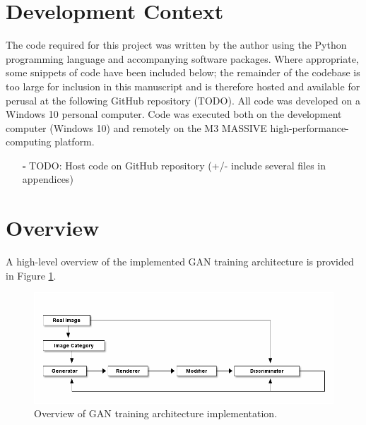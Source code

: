 \documentclass[a4paper,11pt,openany]{book}
\begin{document}
\section*{Development Context}
\label{sec:orga3f9e92}

The code required for this project was written by the author using the Python programming language and accompanying software packages.
Where appropriate, some snippets of code have been included below; the remainder of the codebase is too large for inclusion in this manuscript and is therefore hosted and available for perusal at the following GitHub repository (TODO).
All code was developed on a Windows 10 personal computer.
Code was executed both on the development computer (Windows 10) and remotely on the M3 MASSIVE high-performance-computing platform.

\begin{itemize}
\item[{$\square$}] TODO: Host code on GitHub repository (+/- include several files in appendices)
\end{itemize}

\section*{Overview}
\label{sec:org4a5d15d}

A high-level overview of the implemented GAN training architecture is provided in Figure \ref{fig:org6bc4e92}.

\begin{figure}[htbp]
\centering
\includegraphics[width=.9\linewidth]{images/methods_training_architecture.png}
\caption{\label{fig:org6bc4e92}
Overview of GAN training architecture implementation.}
\end{figure}
\end{document}
